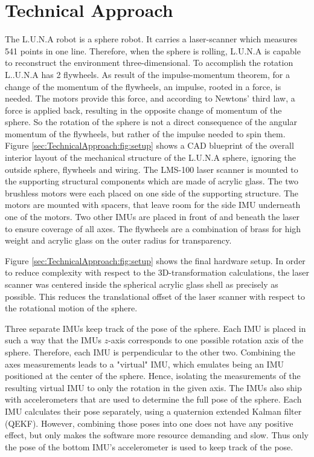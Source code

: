 \section{Technical Approach}
\label{sec:TechnicalApproach}

The L.U.N.A robot is a sphere robot. It carries a  laser-scanner which measures 541 points in one line. Therefore, when the sphere is rolling, L.U.N.A is capable to reconstruct the environment three-dimensional. To accomplish the rotation L..U.N.A has 2 flywheels.
As result of the impulse-momentum theorem, for a change of the momentum of the flywheels, an impulse, rooted in a force, is needed. 
The motors provide this force, and according to Newtons' third law, a force is applied back, resulting in the opposite change of momentum of the sphere. 
So the rotation of the sphere is not a direct consequence of the angular momentum of the flywheels, but rather of the impulse needed to spin them. 
Figure \ref{sec:TechnicalApproach:fig:setup} shows a CAD blueprint of the overall interior layout of the mechanical structure of the L.U.N.A sphere, ignoring the outside sphere, flywheels and wiring.
The LMS-100 laser scanner is mounted to the supporting structural components which are made of acrylic glass.
The two brushless motors were each placed on one side of the supporting structure. 
The motors are mounted with spacers, that leave room for the side IMU underneath one of the motors. 
Two other IMUs are placed in front of and beneath the laser to ensure coverage of all axes. 
The flywheels are a combination of brass for high weight and acrylic glass on the outer radius for transparency.

Figure \ref{sec:TechnicalApproach:fig:setup} shows the final hardware setup.
In order to reduce complexity with respect to the 3D-transformation calculations, the laser scanner was centered inside the spherical acrylic glass shell as precisely as possible.
This reduces the translational offset of the laser scanner with respect to the rotational motion of the sphere. 
                                   

Three separate IMUs keep track of the pose of the sphere. Each IMU is placed in such a way that the IMUs $z$-axis corresponds to one possible rotation axis of the sphere.
Therefore, each IMU is perpendicular to the other two.
Combining the axes measurements leads to a "virtual" IMU, which emulates being an IMU positioned at the center of the sphere. 
Hence, isolating the measurements of the resulting virtual IMU to only the rotation in the given axis.
The IMUs also ship with accelero\-meters that are used to determine the full pose of the sphere.
Each IMU calculates their pose separately, using a quaternion extended Kalman filter (QEKF).
However, combining those poses into one does not have any positive effect, but only makes the software more resource demanding and slow.
Thus only the pose of the bottom IMU's accelerometer is used to keep track of the pose.

